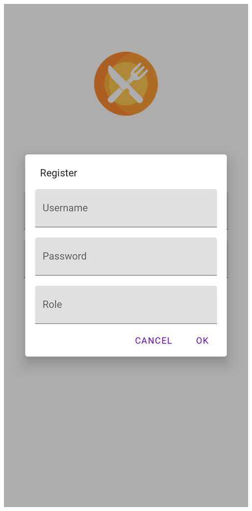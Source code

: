 \documentclass{article}
\begin{document}
\begin{center}
\includegraphics[scale=0.15]{register}

\end{center}
\end{document}
